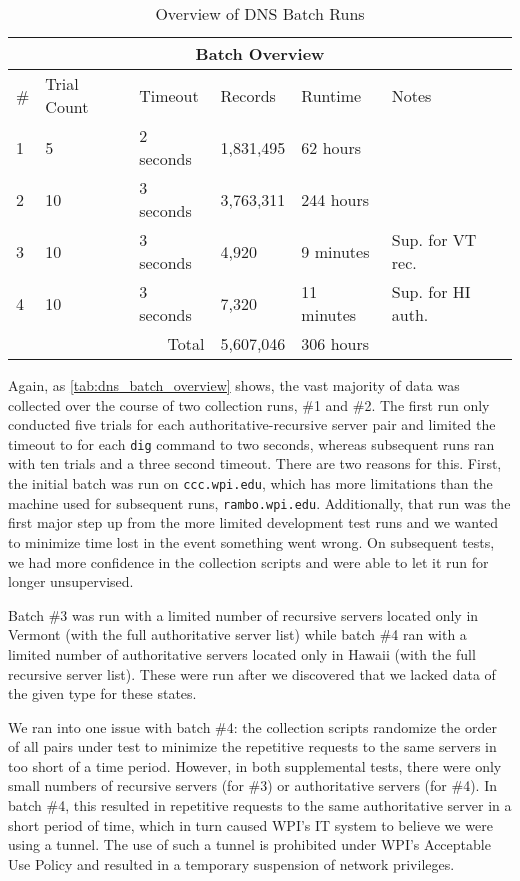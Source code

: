 \begin{table}[h]
    \centering
    \begin{tabular}{ |p{1cm}||p{2cm}|p{2cm}|p{2cm}|p{2cm}|p{4cm}|  }
     \hline
     \multicolumn{6}{|c|}{Batch Overview} \\
     \hline
     \# & Trial Count & Timeout & Records & Runtime & Notes \\
     \hline
     1 & 5 & 2 seconds & 1,831,495 & 62 hours & \\
     2 & 10 & 3 seconds & 3,763,311 & 244 hours & \\
     3 & 10 & 3 seconds & 4,920 & 9 minutes  & Sup. for VT rec. \\
     4 & 10 & 3 seconds & 7,320 & 11 minutes & Sup. for HI auth. \\
     \hline
     \multicolumn{3}{|r|}{Total} & 5,607,046 & 306 hours & \\
     \hline
    \end{tabular}
    \caption{Overview of DNS Batch Runs}
    \label{tab:dns_batch_overview}
\end{table}

Again, as \autoref{tab:dns_batch_overview} shows, the vast majority of data was collected over the course of two collection runs, \#1 and \#2. The first run only conducted five trials for each authoritative-recursive server pair and limited the timeout to for each \texttt{dig} command to two seconds, whereas subsequent runs ran with ten trials and a three second timeout. There are two reasons for this. First, the initial batch was run on \texttt{ccc.wpi.edu}, which has more limitations than the machine used for subsequent runs, \texttt{rambo.wpi.edu}. Additionally, that run was the first major step up from the more limited development test runs and we wanted to minimize time lost in the event something went wrong. On subsequent tests, we had more confidence in the collection scripts and were able to let it run for longer unsupervised.

Batch \#3 was run with a limited number of recursive servers located only in Vermont (with the full authoritative server list) while batch \#4 ran with a limited number of authoritative servers located only in Hawaii (with the full recursive server list). These were run after we discovered that we lacked data of the given type for these states. 

We ran into one issue with batch \#4: the collection scripts randomize the order of all pairs under test to minimize the repetitive requests to the same \dns servers in too short of a time period. However, in both supplemental tests, there were only small numbers of recursive servers (for \#3) or authoritative servers (for \#4). In batch \#4, this resulted in repetitive requests to the same authoritative server in a short period of time, which in turn caused WPI's IT system to believe we were using a \dns tunnel. The use of such a tunnel is prohibited under WPI's Acceptable Use Policy and resulted in a temporary suspension of network privileges.

